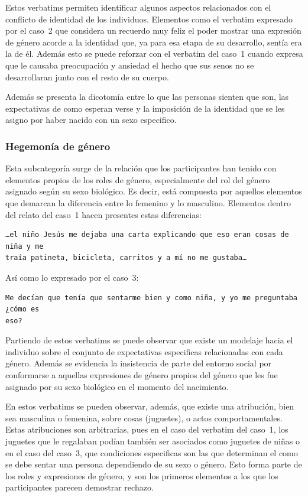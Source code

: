 Estos verbatims permiten identificar algunos aspectos relacionados con el
conflicto de identidad de los individuos. Elementos como el verbatim expresado
por el caso~2 que considera un recuerdo muy feliz el poder mostrar una
expresión de género acorde a la identidad que, ya para esa etapa de su
desarrollo, sentía era la de él. Además esto se puede reforzar con el verbatim
del caso~1 cuando expresa que le causaba preocupación y ansiedad el hecho que
sus senos no se desarrollaran junto con el resto de su cuerpo.

Además se presenta la dicotomía entre lo que las personas sienten que son, las
expectativas de como esperan verse y la imposición de la identidad que se
les asigno por haber nacido con un sexo especifico.

\subsubsection{Hegemonía de género}

Esta subcategoría surge de la relación que los participantes han tenido con
elementos propios de los roles de género, especialmente del rol del género
asignado según su sexo biológico. Es decir, está compuesta por aquellos
elementos que demarcan la diferencia entre lo femenino y lo masculino. Elementos
dentro del relato del caso~1 hacen presentes estas diferencias:

\begin{verbatim}
…el niño Jesús me dejaba una carta explicando que eso eran cosas de niña y me
traía patineta, bicicleta, carritos y a mí no me gustaba…
\end{verbatim}

Así como lo expresado por el caso~3:

\begin{verbatim}
Me decían que tenía que sentarme bien y como niña, y yo me preguntaba ¿cómo es
eso?
\end{verbatim}

Partiendo de estos verbatims se puede observar que existe un modelaje hacia el
individuo sobre el conjunto de expectativas especificas relacionadas con cada
género. Además se evidencia la insistencia de parte del entorno social por
conformarse a aquellas expresiones de género propios del género que les fue
asignado por su sexo biológico en el momento del nacimiento.

En estos verbatims se pueden observar, además, que existe una atribución, bien
sea masculina o femenina, sobre cosas (juguetes), o actos comportamentales.
Estas atribuciones son arbitrarias, pues en el caso del verbatim del caso~1,
los juguetes que le regalaban podían también ser asociados como juguetes de
niñas o en el caso del caso~3, que condiciones especificas son las que
determinan el como se debe sentar una persona dependiendo de su sexo o género.
Esto forma parte de los roles y expresiones de género, y son los primeros
elementos a los que los participantes parecen demostrar rechazo.

